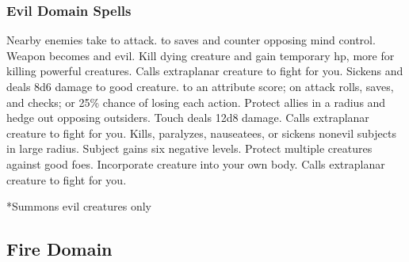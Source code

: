 \subsubsection{Evil Domain Spells}
\begin{spelllist}
   Nearby enemies take  to attack.
    to saves and counter opposing mind control.
   Weapon becomes  and evil.
   Kill dying creature and gain temporary hp, more for killing powerful creatures.
  \spellhead[3]{}
  \spellhead[3]{}
   Calls extraplanar creature to fight for you.
   Sickens and deals 8d6 damage to good creature.
    to an attribute score;  on attack rolls, saves, and checks; or 25\% chance of losing each action.
   Protect allies in a \areamed radius and hedge out opposing outsiders.
   Touch deals 12d8 damage.
   Calls extraplanar creature to fight for you.
   Kills, paralyzes, nauseatees, or sickens nonevil subjects in large radius.
  \spellhead[7]{}
   Subject gains six negative levels.
  \F Protect multiple creatures against good foes. 
   Incorporate creature into your own body.
   Calls extraplanar creature to fight for you.
\end{spelllist}
*Summons evil creatures only

\subsection{Fire Domain}

